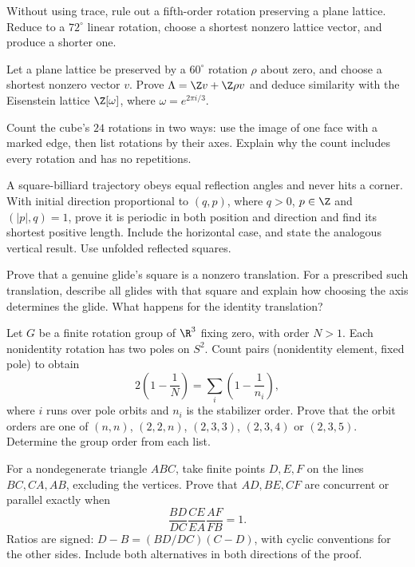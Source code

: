 \begin{exercise}[$\star$]\label{geometry:ex:fivefold}
Without using trace, rule out a fifth-order rotation preserving a plane lattice. Reduce to a $72^\circ$ linear rotation, choose a shortest nonzero lattice vector, and produce a shorter one.
\end{exercise}
\begin{exercise}[$\star\star$]\label{geometry:ex:hexagonal}
Let a plane lattice be preserved by a $60^\circ$ rotation $\rho$ about zero, and choose a shortest nonzero vector $v$. Prove $\Lambda=\Z v+\Z\rho v$ and deduce similarity with the Eisenstein lattice $\Z[\omega]$, where $\omega=e^{2\pi i/3}$.
\end{exercise}
\begin{exercise}[$\star\star$]\label{geometry:ex:cube}
Count the cube's $24$ rotations in two ways: use the image of one face with a marked edge, then list rotations by their axes. Explain why the count includes every rotation and has no repetitions.
\end{exercise}
\begin{exercise}[$\star\star$]\label{geometry:ex:billiards}
A square-billiard trajectory obeys equal reflection angles and never hits a corner. With initial direction proportional to $(q,p)$, where $q>0$, $p\in\Z$ and $(|p|,q)=1$, prove it is periodic in both position and direction and find its shortest positive length. Include the horizontal case, and state the analogous vertical result. Use unfolded reflected squares.
\end{exercise}
\begin{exercise}[$\star$]\label{geometry:ex:glidesquare}
Prove that a genuine glide's square is a nonzero translation. For a prescribed such translation, describe all glides with that square and explain how choosing the axis determines the glide. What happens for the identity translation?
\end{exercise}
\begin{exercise}[$\star\star\star$]\label{geometry:ex:finiteSO3}
Let $G$ be a finite rotation group of $\R^3$ fixing zero, with order $N>1$. Each nonidentity rotation has two poles on $S^2$. Count pairs (nonidentity element, fixed pole) to obtain
\[
2\left(1-\frac1N\right)=\sum_i\left(1-\frac1{n_i}\right),
\]
where $i$ runs over pole orbits and $n_i$ is the stabilizer order. Prove that the orbit orders are one of $(n,n)$, $(2,2,n)$, $(2,3,3)$, $(2,3,4)$ or $(2,3,5)$. Determine the group order from each list.
\end{exercise}
\begin{exercise}[$\star\star$]\label{geometry:ex:ceva}
For a nondegenerate triangle $ABC$, take finite points $D,E,F$ on the lines $BC,CA,AB$, excluding the vertices. Prove that $AD,BE,CF$ are concurrent or parallel exactly when
\[
\frac{BD}{DC}\frac{CE}{EA}\frac{AF}{FB}=1.
\]
Ratios are signed: $D-B=(BD/DC)(C-D)$, with cyclic conventions for the other sides. Include both alternatives in both directions of the proof.
\end{exercise}
